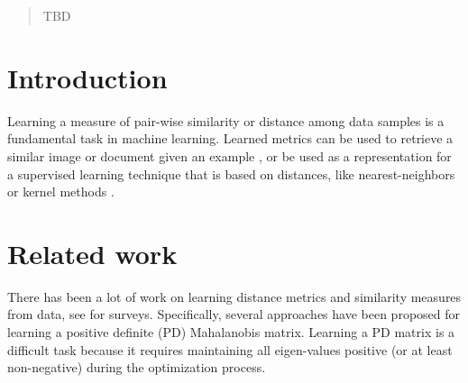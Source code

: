 \documentclass{article}
\begin{document}
 


\newcommand\todo[1]{\textbf{<ToDo:#1}!}
\newcommand\mat[1]{{#1}}
\renewcommand\vec[1]{\mathbf{#1}}
\newcommand{\T}{{}^\mathsf{T}}
\newcommand{\W}{\mat{W}}
\newcommand{\E}{\mat{E}}
\newcommand{\newW}{{\mat{W^*}}}
\newcommand{\eqdef}{\doteq}
\newcommand{\Rd}{\mathbb{R}^d}
\newcommand{\tL}{\tilde{L}(\W)}


\newtheorem{theorem}{Theorem}
\newtheorem{lemma}{Lemma}
\newtheorem{corollary}{Corollary}
\newtheorem{definition}{Definition}



\begin{abstract} 
TBD
\end{abstract} 

\section{Introduction}
Learning a measure of pair-wise similarity or distance among data samples is a fundamental task in machine learning. Learned metrics can be used to retrieve a similar image or document given an example \cite{}, or be used as a representation for a supervised learning technique that is based on distances, like nearest-neighbors or kernel methods \cite{}.


\section{Related work}
There has been a lot of work on learning distance metrics and similarity measures from data, see \cite{bellet2013survey, kulis2012survey, yang2006survey} for surveys. Specifically, several approaches have been proposed for learning a positive definite (PD) Mahalanobis matrix. Learning a PD matrix is a difficult task because it requires maintaining all eigen-values positive (or at least non-negative) during the optimization process. 
\end{document}
